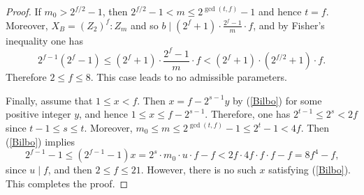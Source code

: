 \documentclass[a4paper,twopage,reqno,12pt]{amsart}
\theoremstyle{definition}
\numberwithin{equation}{section}
\renewcommand{\leq}{\leqslant}
\begin{document}
\begin{proof}


If $m_{0} > 2^{f/2}-1$, then $ 2^{f/2}-1<m\leq 2^{\gcd(t,f)}-1$ and hence $t=f$. Moreover, $X_{B}=(Z_{2})^{f}:Z_{m}$ and so
$b\mid \left( 2^{f}+1\right)
\cdot \frac{2^{f}-1}{m} \cdot f$,
and by Fisher's inequality one has 
\begin{equation}\label{orodruin}
2^{f-1}(2^{f}-1)\leq \left( 2^{f}+1\right)
\cdot \frac{2^{f}-1}{m}\cdot f < \left(2^{f}+1\right)
\cdot \left(2^{f/2}+1\right) \cdot f\text{.}
\end{equation}
Therefore $2\leq f\leq 8$. This case leads to no admissible parameters. 

Finally, assume that $1\leq x < f$. Then $x =f - 2^{s-1}y$ by (\ref{Bilbo}) for some positive integer $y$, and hence $1 \leq x\leq f-2^{s-1}$. Therefore, one has $2^{t-1}\leq 2^{s}<2f$ since $t-1\leq s\leq t$. Moreover, $m_{0}\leq m\leq 2^{\gcd(t,f)}-1\leq 2^{t}-1<4f$. Then (\ref{Bilbo}) implies 
$$2^{f-1}-1\leq (2^{f-1}-1)x=2^{s}\cdot m_{0}\cdot u\cdot f-f<2f\cdot 4f \cdot f \cdot f-f=8f^{4}-f\text{,}$$
since $u \mid f$, and then $2\leq f\leq 21$. However, there is no such $x$ satisfying (\ref{Bilbo}).
This completes the proof.


\end{proof}
\end{document}
